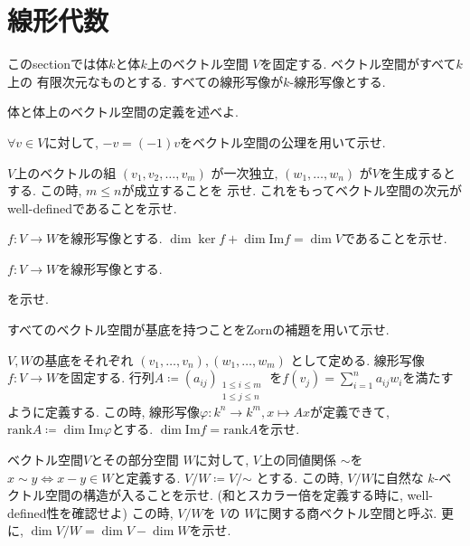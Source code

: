 \documentclass[lualatex]{exam}
\theoremstyle{remark}
\theoremstyle{plain}
\begin{document}
\section{線形代数}
このsectionでは体$k$と体$k$上のベクトル空間 $V$を固定する. ベクトル空間がすべて$k$上の
有限次元なものとする. すべての線形写像が$k$-線形写像とする. 
\begin{questions}

  \question 体と体上のベクトル空間の定義を述べよ.

  \question $\forall v \in V$に対して, $-v = (-1)v$をベクトル空間の公理を用いて示せ.
  
  \question $V$上のベクトルの組 $\left( v_1, v_2, \ldots, v_m \right) $ が一次独立, 
  $\left( w_1, \ldots ,w_n \right) $ が$V$を生成するとする. この時,  $m \leq n$が成立することを
  示せ. これをもってベクトル空間の次元がwell-definedであることを示せ.
  
  \question $f:V \to W$を線形写像とする. $\dim \ker f + \dim \mathrm{Im} f= \dim V$であることを示せ. 
  
  \question $f:V\to W$を線形写像とする. 
  を示せ. 
  
  \question すべてのベクトル空間が基底を持つことをZornの補題を用いて示せ.
  
  \question $V,W$の基底をそれぞれ $\left( v_1,\ldots,v_n \right), \left( w_1, \ldots ,w_m \right)  $ として定める. 
  線形写像$f:V \to W$を固定する. 行列$A \coloneqq \left( a_{ij} \right)_{\substack{1\leq i \leq m \\  1 \leq j \leq n}} $ を$f(v_j) = \sum_{i=1}^{n} a_{ij} w_i$を満たすように定義する. 
  この時, 線形写像$\varphi : k^n \to k^m, x \mapsto Ax $が定義できて, $\mathrm{rank} A \coloneqq \dim \mathrm{Im}\varphi  $とする. 
  $\dim \mathrm{Im}f = \mathrm{rank}A$を示せ.

  \question ベクトル空間$V$とその部分空間 $W$に対して, 
  $V$上の同値関係 $\sim $を $x \sim y \iff x - y \in W$と定義する. $V  /\mathord{W} \coloneqq V/ \mathord{\sim}$ 
   とする. この時, $V /W$に自然な $k$-ベクトル空間の構造が入ることを示せ. 
   (和とスカラー倍を定義する時に, well-defined性を確認せよ) この時, $V/ \mathord{W} $を $V$の
   $W$に関する商ベクトル空間と呼ぶ.
   更に,  $\dim V/ \mathord{W} = \dim V - \dim W$を示せ.
   

\end{questions}
\end{document}
